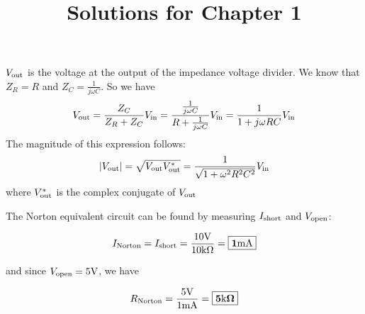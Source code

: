 \documentclass{article}
\begin{document}
\title{Solutions for Chapter 1}

    $V_{\text{out}}$ is the voltage at the output of the impedance voltage divider. We know that $Z_R = R$ and $Z_C = \frac{1}{j\omega C}$. So we have 
    \[V_{\text{out}} = \frac{Z_C}{Z_R + Z_C} V_{\text{in}} = \frac{\frac{1}{j \omega C}}{R + \frac{1}{j \omega C}} V_{\text{in}} = \frac{1}{1 + j \omega R C} V_{\text{in}}\]
    The magnitude of this expression follows:
    \[|V_{\text{out}}| = \sqrt{V_{\text{out}} V_{\text{out}}^*} = \frac{1}{\sqrt{1 + \omega^2R^2C^2}}V_{\text{in}}\]
    where $V_{\text{out}}^*$ is the complex conjugate of $V_{\text{out}}$
    
    The Norton equivalent circuit can be found by measuring $I_{\text{short}}$ and $V_{\text{open}}$:
    
    \[I_{\text{Norton}} = I_{\text{short}} = \frac{10\text{V}}{10\text{k}\Omega} = \boxed{\mathbf{1\text{m}\text{A}}}\] 
    
    and since $V_{\text{open}} = 5\text{V}$, we have
    
    \[R_{\text{Norton}} = \frac{5\text{V}}{1\text{m}\text{A}} = \boxed{\mathbf{5\text{k}\Omega}}\]
    
\end{document}
